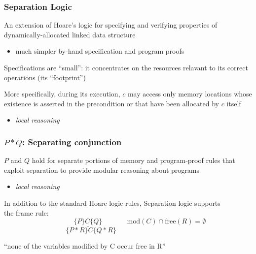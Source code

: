 \documentclass[xcolor=dvipsnames,9pt,hide notes,mathserif]{beamer}
\begin{document}
\begin{frame}
  \frametitle{Separation Logic}

An extension of Hoare's logic for specifying and verifying properties of dynamically-allocated linked data structure
\begin{itemize}
\item much simpler by-hand specification and program proofs
\end{itemize}

\vskip0.5cm

Specifications are ``small'': it concentrates on the resources relavant to its correct operations (its ``footprint'')

\vskip0.5cm

More specifically, during its execution, $c$ may access only memory locations whose existence is asserted in the precondition or that have been allocated by $c$ itself
  \begin{itemize} 
  \item \textit{local reasoning}
  \end{itemize}
\end{frame}




\begin{frame}
  \frametitle{$P \ast Q$: Separating conjunction}

$P$ and $Q$ hold for separate portions of memory and program-proof rules that exploit separation to provide modular reasoning about programs

  \begin{itemize} 
  \item \textit{local reasoning}
  \end{itemize}
  \vskip1cm
In addition to the standard Hoare logic rules, Separation logic supports\\
the frame rule:\\
  \[\underline{\phantom{XXXX} \{P\} C \{Q\} \phantom{XXXX}} \; \mathrm{mod}(C) \cap \mathrm{free}(R)=\emptyset\]
  \[ \{P \ast R\} C \{Q \ast R\} \phantom{XXXXXXXXXXXXX}\]

\vskip0.3cm
``none of the variables modified by C occur free in R''

\end{frame}
\end{document}

